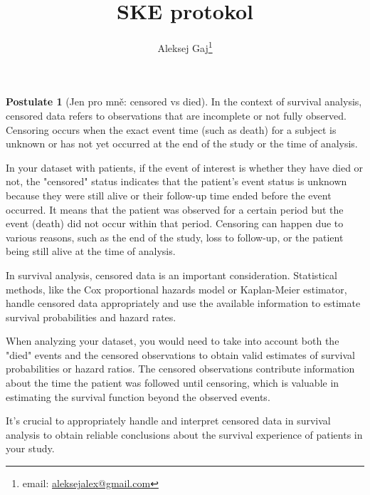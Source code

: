 \documentclass[a4, 11pt]{article}
\title{SKE protokol}
\author{Aleksej Gaj\footnote{email: \href{mailto:aleksejalex@gmail.com}{aleksejalex@gmail.com}}}
\theoremstyle{definition}
\newtheorem{temppostulateforbackground}{Postulate}
\newenvironment{postulate}
{
	\colorlet{shadecolor}{orange!15}
	\begin{shaded} \vspace{-10pt}
		\begin{temppostulateforbackground}
		}
		{
		\end{temppostulateforbackground} \vspace{-10pt}
	\end{shaded}
}
\theoremstyle{remark}
\begin{document}
	\maketitle	
	\tableofcontents
	
	\newpage
	
	\begin{postulate}[Jen pro mně: censored vs died]
		In the context of survival analysis, censored data refers to observations that are incomplete or not fully observed. Censoring occurs when the exact event time (such as death) for a subject is unknown or has not yet occurred at the end of the study or the time of analysis.
		
		In your dataset with patients, if the event of interest is whether they have died or not, the "censored" status indicates that the patient's event status is unknown because they were still alive or their follow-up time ended before the event occurred. It means that the patient was observed for a certain period but the event (death) did not occur within that period. Censoring can happen due to various reasons, such as the end of the study, loss to follow-up, or the patient being still alive at the time of analysis.
		
		In survival analysis, censored data is an important consideration. Statistical methods, like the Cox proportional hazards model or Kaplan-Meier estimator, handle censored data appropriately and use the available information to estimate survival probabilities and hazard rates.
		
		When analyzing your dataset, you would need to take into account both the "died" events and the censored observations to obtain valid estimates of survival probabilities or hazard ratios. The censored observations contribute information about the time the patient was followed until censoring, which is valuable in estimating the survival function beyond the observed events.
		
		It's crucial to appropriately handle and interpret censored data in survival analysis to obtain reliable conclusions about the survival experience of patients in your study.
	\end{postulate}
\newpage
	
\end{document}

